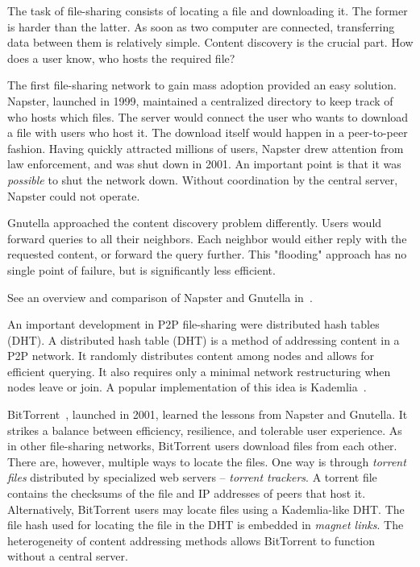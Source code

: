The task of file-sharing consists of locating a file and downloading it.
The former is harder than the latter.
As soon as two computer are connected, transferring data between them is relatively simple.
Content discovery is the crucial part.
How does a user know, who hosts the required file?

The first file-sharing network to gain mass adoption provided an easy solution.
Napster, launched in 1999, maintained a centralized directory to keep track of who hosts which files.
The server would connect the user who wants to download a file with users who host it.
The download itself would happen in a peer-to-peer fashion.
Having quickly attracted millions of users, Napster drew attention from law enforcement, and was shut down in 2001.
An important point is that it was \textit{possible} to shut the network down.
Without coordination by the central server, Napster could not operate.

Gnutella approached the content discovery problem differently.
Users would forward queries to all their neighbors.
Each neighbor would either reply with the requested content, or forward the query further.
This "flooding" approach has no single point of failure, but is significantly less efficient.

See an overview and comparison of Napster and Gnutella in~\cite{Saroiu2003}.

An important development in P2P file-sharing were distributed hash tables (DHT).
A distributed hash table (DHT) is a method of addressing content in a P2P network.
It randomly distributes content among nodes and allows for efficient querying.
It also requires only a minimal network restructuring when nodes leave or join.
A popular implementation of this idea is Kademlia~\cite{Maymounkov2002}.

BitTorrent~\cite{Pouwelse2005}, launched in 2001, learned the lessons from Napster and Gnutella.
It strikes a balance between efficiency, resilience, and tolerable user experience.
As in other file-sharing networks, BitTorrent users download files from each other.
There are, however, multiple ways to locate the files.
One way is through \textit{torrent files} distributed by specialized web servers -- \textit{torrent trackers}.
A torrent file contains the checksums of the file and IP addresses of peers that host it.
Alternatively, BitTorrent users may locate files using a Kademlia-like DHT.
The file hash used for locating the file in the DHT is embedded in \textit{magnet links}.
The heterogeneity of content addressing methods allows BitTorrent to function without a central server.

